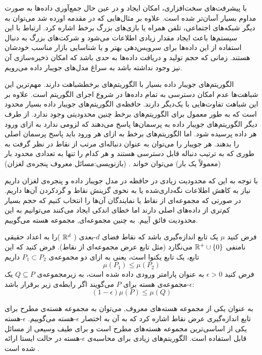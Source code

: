با پیشرفت‌های سخت‌افزاری، امکان ایجاد و در عین حال جمع‌آوری داده‌ها به صورت مداوم بسیار آسان‌تر شده است. علاوه بر مثال‌هایی که در مقدمه اورده شد می‌توان به دیگر شبکه‌های اجتماعی، تلفن همراه یا بازی‌های بزرگ برخط اشاره کرد. ارتباط با این سیستم‌ها باعث ایجاد مقدار زیادی اطلاعات می‌شود و شرکت‌های بزرگ به دنبال استفاده از این داده‌ها برای سرویس‌دهی بهتر و یا شناسایی بازار مناسب خودشان هستند. زمانی که حجم تولید و دریافت داده‌ها به حدی باشد که امکان ذخیره‌سازی آن نیز وجود نداشته باشد به سراغ مدل‌های جویبار داده می‌رویم.

الگوریتم‌های جویبار داده بسیار با الگوریتم‌های برخطشباهت دارند. مهم‌ترین این شباهت‌ها عدم امکان دسترسی به تمام داده‌ها در شروع اجرای الگوریتم است. علاوه بر این شباهت تفاوت‌هایی با یک‌دیگر دارند. حافظه‌ی الگوریتم‌های جویبار داده بسیار محدود است که به طور معمول برای الگوریتم‌های برخط چنین محدودیتی وجود ندارد. از طرف دیگر الگوریتم‌های جویبار داده به پرسمان‌ها پاسخ می‌دهند که لزومی ندارد به ازای ورود هر داده پرسیده شود. اما الگوریتم‌های برخط به ازای هر ورود باید پاسخ پرسمان اصلی را بدهند.
هر جویبار را می‌توان به عنوان دنباله‌ای مرتب از نقاط در نظر گرفت به طوری که به ترتیب دنباله قابل دسترسی هستند و هر کدام را تنها به تعدادی محدود بار (معمولاً یک بار) می‌توان خواند .
(بازنویسی:مسائل معروف پنجره‌ی لغزان)

با توجه به این که محدودیت زیادی در حافظه در مدل جویبار داده و پنجره‌ی لغزان داریم نیاز به کاهش اطلاعات نگه‌داری‌شده یا به نحوی گزینش نقاط و گردکردن آن‌ها داریم.
در صورتی که مجموعه‌ای از نقاط یا نمایندگان آن‌ها را انتخاب کنیم که حجم بسیار کم‌تری از داده‌های اصلی دارند اما خطای اندکی ایجاد می‌کنند می‌توانیم به این محدودیت فائق آییم. به چنین مجموعه‌ای, مجموعه هسته می‌گوییم.


فرض کنید $\mu$ یک تابع اندازه‌گیری باشد که نقاط فضای $d$-بعدی ‌( $\mathbb{R}^d$ )را به اعداد حقیقی نامنفی $\mathbb{R}^+ \cup \left\{ 0 \right\}$ می‌نگارد (مثل تابع عرض مجموعه‌ای از نقاط). 
فرض کنید که این تابع، یک تابع یکنوا است، یعنی به ازای دو مجموعه‌ی  $P_1 \subset P_2$ داریم
$$\mu(P_1) \leq \mu(P_2)$$
فرض کنید $\epsilon > 0$ به عنوان پارامتر ورودی داده شده است، به زیرمجموعه‌ی $Q \subseteq P$ یک $\epsilon$-مجموعه‌ی هسته برای $P$ می‌گویند اگر رابطه‌ی زیر برقرار باشد:
$$(1 - \epsilon) \mu(P) \leq \mu (Q)$$


به عنوان یکی از مجموعه هسته‌های معروف, می‌توان به مجموعه هسته‌ی مطرح برای تابع اندازه‌گیری عرض نقاط اشاره کرد که به آن به اختصار $\epsilon$-هسته می‌گوییم.
$\epsilon$-هسته 
یکی از اساسی‌ترین مجموعه هسته‌های مطرح است و برای طیف وسیعی از مسائل قابل استفاده است.
الگوریتم‌های زیادی برای محاسبه‌ی $\epsilon$-هسته در حالت ایستا ارائه شده است . 

